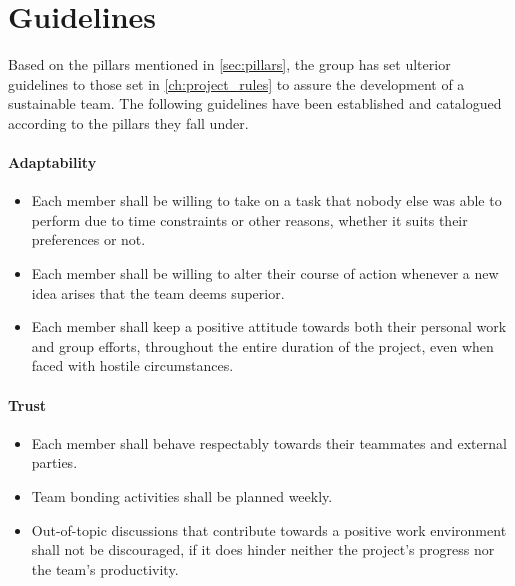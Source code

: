 \section{Guidelines}\label{sec:actions}
Based on the pillars mentioned in \cref{sec:pillars}, the group has set ulterior guidelines to those set in \cref{ch:project_rules} to assure the development of a sustainable team.
The following guidelines have been established and catalogued according to the pillars they fall under.

\paragraph{Adaptability}
\begin{itemize}
    \item Each member shall be willing to take on a task that nobody else was able to perform due to time constraints or other reasons, whether it suits their preferences or not.
    
    \item Each member shall be willing to alter their course of action whenever a new idea arises that the team deems superior.

    \item Each member shall keep a positive attitude towards both their personal work and group efforts, throughout the entire duration of the project, even when faced with hostile circumstances.
\end{itemize}

\paragraph{Trust}
\begin{itemize}
    \item Each member shall behave respectably towards their teammates and external parties.
    
    \item Team bonding activities shall be planned weekly. 

    \item Out-of-topic discussions that contribute towards a positive work environment shall not be discouraged, if it does hinder neither the project's progress nor the team's productivity.
\end{itemize}

